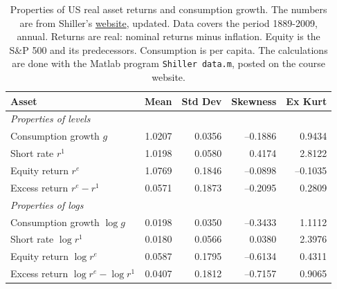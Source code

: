 \documentclass[11pt]{article}
\begin{document}
\pagebreak
\begin{table}[ht!]
\caption{Properties of US real asset returns and consumption growth.
The numbers are from Shiller's
\href{http://www.econ.yale.edu/~shiller/data.htm}{website}, updated.
Data covers the period 1889-2009, annual.
Returns are real:  nominal returns minus inflation.
Equity is the S\&P 500 and its predecessors.
Consumption is per capita.
The calculations are done with the Matlab program
{\tt Shiller data.m},
posted on the course website.}

\bigskip
\tabcolsep=10pt
\begin{tabular}{lrrrr}
\toprule
Asset       & Mean  & Std Dev  & Skewness & Ex Kurt \\
\midrule
\multicolumn{3}{l}{\it Properties of levels} \\
Consumption growth $g$ \phantom{xxxxxxxxxxx}
                        & 1.0207  &  0.0356  & --0.1886 & 0.9434 \\
Short rate $r^1 $       & 1.0198  &  0.0580  &  0.4174  &  2.8122 \\
Equity return $r^e$     & 1.0769  &  0.1846  & --0.0898 & --0.1035 \\
Excess return $r^e-r^1$ & 0.0571  &  0.1873  & --0.2095 &   0.2809 \\
\midrule
\multicolumn{3}{l}{\it Properties of logs} \\
Consumption growth $\log g$  & 0.0198 & 0.0350 & --0.3433 & 1.1112  \\
Short rate $\log r^1 $       &  0.0180  & 0.0566  &  0.0380   & 2.3976 \\
Equity return $\log r^e$     &  0.0587  & 0.1795  & --0.6134  &  0.4311 \\
Excess return $\log r^e - \log r^1$ &  0.0407 & 0.1812 & --0.7157 & 0.9065 \\
\bottomrule
\end{tabular}
\label{fig:Shiller}
\end{table}
\end{document}
